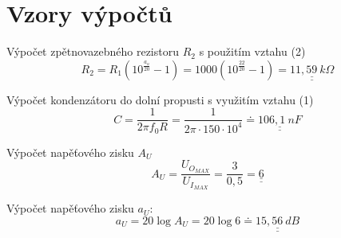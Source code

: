 \section*{Vzory výpočtů}
  
  Výpočet zpětnovazebného rezistoru $R_2$ s použitím vztahu (2)
  \begin{equation}  	
    R_{2} = R_1 (10^{\frac{a_u}{20}} - 1) = 1000 (10^{\frac{22}{20}} - 1) = \underline{\underline{11,59~k\Omega}}
    \nonumber
  \end{equation}
  
  Výpočet kondenzátoru do dolní propusti s využitím vztahu (1)
  \begin{equation}
    C = \dfrac{1}{2\pi f_0 R} = \dfrac{1}{2\pi \cdot 150 \cdot 10^4} \doteq \underline{\underline{106,1~nF}}
    \nonumber
  \end{equation}   


  Výpočet napěťového zisku $A_U$
  \begin{equation}
    A_U = \dfrac{U_{O_{MAX}}}{{U_{I_{MAX}}}} = \dfrac{3}{0,5} = \underline{\underline{6}}
    \nonumber
  \end{equation} 

  
  Výpočet napěťového zisku $a_U$:
  \begin{equation}
    a_U = 20\log A_U = 20\log 6 \doteq \underline{\underline{15,56~dB}}
    \nonumber
  \end{equation}     
 
